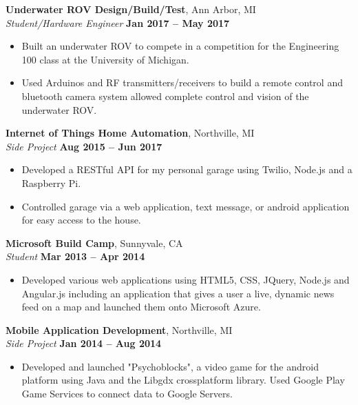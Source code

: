 \documentclass[margin,line]{resume}
\begin{document}
\begin{resume}
\textbf{Underwater ROV Design/Build/Test}, Ann Arbor, MI \vspace{2mm}\\\vspace{1mm}%
\textsl{Student/Hardware Engineer} \hfill \textbf{Jan 2017 -- May 2017}
\begin{itemize}
	\item Built an underwater ROV to compete in a competition for the Engineering 100 class at the University of Michigan.
	\item Used Arduinos and RF transmitters/receivers to build a remote control and bluetooth camera system allowed complete control and vision of the underwater ROV.
	
\end{itemize}

	\textbf{Internet of Things Home Automation}, Northville, MI \vspace{2mm}\\\vspace{1mm}%
	\textsl{Side Project} \hfill \textbf{Aug 2015 -- Jun 2017}
	\begin{itemize}
		\item Developed a RESTful API for my personal garage using Twilio, Node.js and a Raspberry Pi. 
		\item Controlled garage via a web application, text message, or android application for easy access to the house. 
	\end{itemize}


    \textbf{Microsoft Build Camp}, Sunnyvale, CA \vspace{2mm}\\\vspace{1mm}%
    \textsl{Student} \hfill \textbf{Mar 2013 -- Apr 2014}
    \begin{itemize}
    	\item Developed various web applications using HTML5, CSS, JQuery, Node.js and Angular.js including an application that gives a user a live, dynamic news feed on a map and launched them onto Microsoft Azure. 
    \end{itemize}
 
    \textbf{Mobile Application Development}, Northville, MI \vspace{2mm}\\\vspace{1mm}%
    \textsl{Side Project} \hfill \textbf{Jan 2014 -- Aug 2014}
    \begin{itemize}
    	\item 	Developed and launched "Psychoblocks", a video game for the android platform using Java and the Libgdx cross­platform library. Used Google Play Game Services to connect data to Google Servers.
    \end{itemize}
	

\end{resume}
\end{document}
